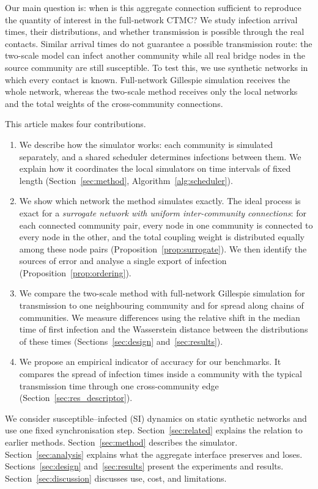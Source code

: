 \documentclass[a4paper,fleqn]{cas-sc}
\begin{document}
Our main question is: when is this aggregate connection sufficient to reproduce the quantity of interest in the full-network CTMC? We study infection arrival times, their distributions, and whether transmission is possible through the real contacts. Similar arrival times do not guarantee a possible transmission route: the two-scale model can infect another community while all real bridge nodes in the source community are still susceptible. To test this, we use synthetic networks in which every contact is known. Full-network Gillespie simulation receives the whole network, whereas the two-scale method receives only the local networks and the total weights of the cross-community connections.

This article makes four contributions.
\begin{enumerate}
\item We describe how the simulator works: each community is simulated separately, and a shared scheduler determines infections between them. We explain how it coordinates the local simulators on time intervals of fixed length (Section~\ref{sec:method}, Algorithm~\ref{alg:scheduler}).
\item We show which network the method simulates exactly. The ideal process is exact for a \emph{surrogate network with uniform inter-community connections}: for each connected community pair, every node in one community is connected to every node in the other, and the total coupling weight is distributed equally among these node pairs (Proposition~\ref{prop:surrogate}). We then identify the sources of error and analyse a single export of infection (Proposition~\ref{prop:ordering}).
\item We compare the two-scale method with full-network Gillespie simulation for transmission to one neighbouring community and for spread along chains of communities. We measure differences using the relative shift in the median time of first infection and the Wasserstein distance between the distributions of these times (Sections~\ref{sec:design} and~\ref{sec:results}).
\item We propose an empirical indicator of accuracy for our benchmarks. It compares the spread of infection times inside a community with the typical transmission time through one cross-community edge (Section~\ref{sec:res_descriptor}).
\end{enumerate}

We consider susceptible--infected (SI) dynamics on static synthetic networks and use one fixed synchronisation step. Section~\ref{sec:related} explains the relation to earlier methods. Section~\ref{sec:method} describes the simulator. Section~\ref{sec:analysis} explains what the aggregate interface preserves and loses. Sections~\ref{sec:design} and~\ref{sec:results} present the experiments and results. Section~\ref*{sec:discussion} discusses use, cost, and limitations.
\end{document}
